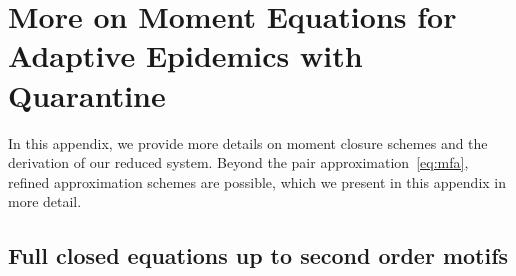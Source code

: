 \documentclass[12pt]{article}
\begin{document}
































\newpage
\appendix

\section{More on Moment Equations for Adaptive Epidemics with Quarantine}
\label{appendixA}

In this appendix, we provide more details on moment closure schemes and the derivation of our reduced system. Beyond the pair approximation~\eqref{eq:mfa}, refined approximation schemes are possible, which we present in this appendix in more detail.

\subsection{Full closed equations up to second order motifs}
\end{document}
